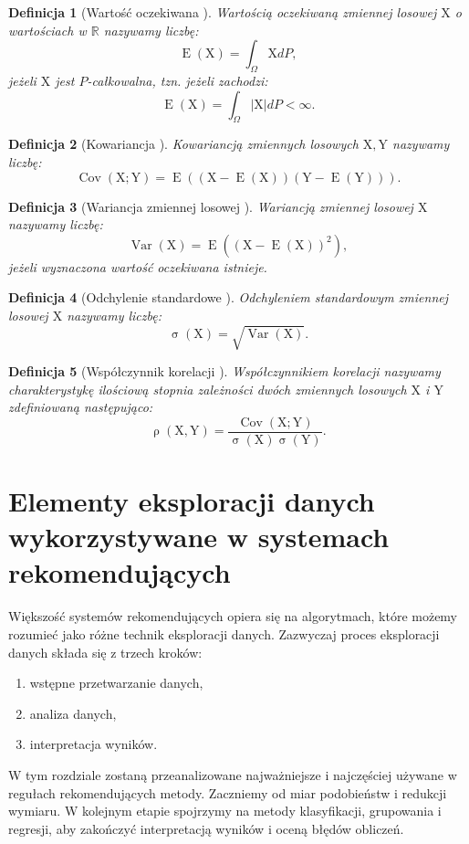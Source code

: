 \documentclass[12pt,a4paper]{report}
\newtheorem{df}{Definicja}[chapter]
\newcommand{\setR}{\mathbb{R}}
\newcommand{\ro}[2]{\operatorname{\rho}\left( {#1},{#2} \right)}
\newcommand{\Covariance}[2]{\operatorname{Cov}\left({#1}; {#2} \right)}
\newcommand{\variance}[1]{\operatorname{Var}\left({#1} \right)}
\newcommand{\e}[1]{\operatorname{E}\left({#1} \right)}
\newcommand{\standard}[1]{\operatorname{\sigma}\left({#1} \right)}
\begin{document}
\begin{df}[Wartość oczekiwana {\citep[Sec 5.6 Def. 2]{jakubowski}}]
Wartością oczekiwaną zmiennej losowej $\mathrm{X}$ o wartościach w $\setR$ nazywamy liczbę:
$$
\e{\mathrm{X}} = \int_{\Omega} \mathrm{X} dP,
$$
jeżeli $\mathrm{X}$ jest $P$-całkowalna, tzn. jeżeli zachodzi:
$$
\e{\mathrm{X}} = \int_{\Omega} |\mathrm{X}| dP < \infty.
$$
\end{df}
\begin{df}[Kowariancja {\citep[Sec 2.8 Def.2.32]{wztp}}]
Kowariancją zmiennych losowych $\mathrm{X},\mathrm{Y}$ nazywamy liczbę:
$$
\Covariance{\mathrm{X}}{\mathrm{Y}} = \e{(\mathrm{X}-\e{\mathrm{X}})(\mathrm{Y}-\e{\mathrm{Y}})}.
$$
\end{df}

\begin{df}[Wariancja zmiennej losowej {\citep[Sec 2.8 Def.2.28]{wztp}}]
Wariancją zmiennej losowej $\mathrm{X}$ nazywamy liczbę:
$$
\variance{\mathrm{X}}=\e{(\mathrm{X}-\e{\mathrm{X}})^2},
$$
jeżeli wyznaczona wartość oczekiwana istnieje.
\end{df} 
\begin{df}[Odchylenie standardowe {\citep[Sec 2.8 Def.2.28]{wztp}}]
Odchyleniem standardowym zmiennej losowej $\mathrm{X}$ nazywamy liczbę:
$$
\standard{\mathrm{X}}=\sqrt{\variance{\mathrm{X}}}.
$$
\end{df}
\begin{df}[Współczynnik korelacji {\citep{wztp}}]
Współczynnikiem korelacji nazywamy charakterystykę ilościową stopnia zależności dwóch zmiennych losowych $\mathrm{X}$ i $\mathrm{Y}$ zdefiniowaną następująco:
$$
\ro{\mathrm{X}}{\mathrm{Y}} = \frac{\Covariance{\mathrm{X}}{\mathrm{Y}}}{\standard{\mathrm{X}} \standard{\mathrm{Y}}}.
$$
\end{df}


\chapter{Elementy eksploracji danych wykorzystywane w systemach rekomendujących}
Większość systemów rekomendujących opiera się na algorytmach, które możemy rozumieć jako różne technik eksploracji danych. 
Zazwyczaj proces eksploracji danych składa się z trzech kroków:
\begin{enumerate}
\item wstępne przetwarzanie danych,
\item analiza danych,
\item interpretacja wyników.
\end{enumerate}
W tym rozdziale zostaną przeanalizowane najważniejsze i najczęściej używane w regułach rekomendujących metody. Zaczniemy od miar podobieństw i redukcji wymiaru. W kolejnym etapie spojrzymy na metody klasyfikacji, grupowania i regresji, aby zakończyć interpretacją wyników i oceną błędów obliczeń.
\end{document}
